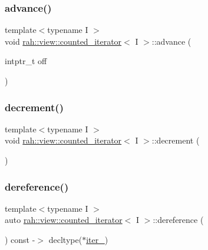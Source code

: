 \subsubsection{\texorpdfstring{advance()}{advance()}}
{\footnotesize\ttfamily template$<$typename I $>$ \\
void \mbox{\hyperlink{structrah_1_1view_1_1counted__iterator}{rah\+::view\+::counted\+\_\+iterator}}$<$ I $>$\+::advance (\begin{DoxyParamCaption}\item[{intptr\+\_\+t}]{off }\end{DoxyParamCaption})\hspace{0.3cm}{\ttfamily [inline]}}

\mbox{\label{structrah_1_1view_1_1counted__iterator_abeb34df8feb243fce3eec27d45b19aa2}} 
\subsubsection{\texorpdfstring{decrement()}{decrement()}}
{\footnotesize\ttfamily template$<$typename I $>$ \\
void \mbox{\hyperlink{structrah_1_1view_1_1counted__iterator}{rah\+::view\+::counted\+\_\+iterator}}$<$ I $>$\+::decrement (\begin{DoxyParamCaption}{ }\end{DoxyParamCaption})\hspace{0.3cm}{\ttfamily [inline]}}

\mbox{\label{structrah_1_1view_1_1counted__iterator_aa0478a9f3d2083f2cd9c42d32e8e4dd5}} 
\subsubsection{\texorpdfstring{dereference()}{dereference()}}
{\footnotesize\ttfamily template$<$typename I $>$ \\
auto \mbox{\hyperlink{structrah_1_1view_1_1counted__iterator}{rah\+::view\+::counted\+\_\+iterator}}$<$ I $>$\+::dereference (\begin{DoxyParamCaption}{ }\end{DoxyParamCaption}) const -\/$>$ decltype($\ast$\mbox{\hyperlink{structrah_1_1view_1_1counted__iterator_a907dba6ac64293e4c5718e522da4972e}{iter\+\_\+}}) \hspace{0.3cm}{\ttfamily [inline]}}

